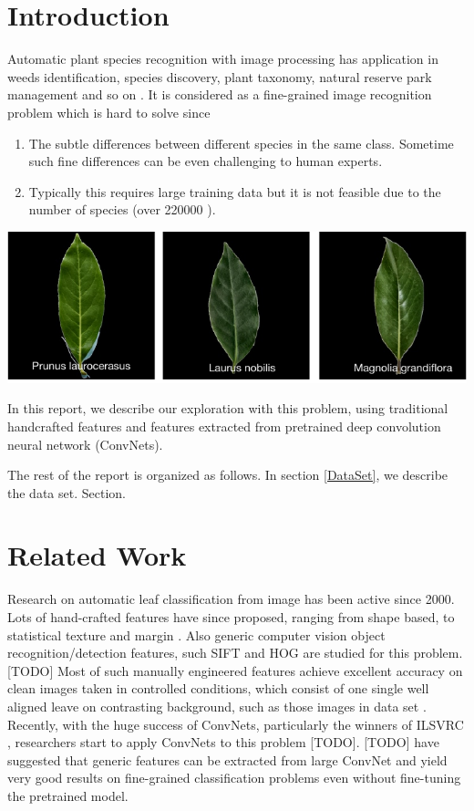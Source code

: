 \documentclass[journal, 10pt]{IEEEtran}
\begin{document}
\section{Introduction}
Automatic plant species recognition with image processing has application in weeds identification, species discovery, plant taxonomy, natural reserve park management and so on \cite{Pedro13}.  It is considered as a fine-grained image recognition problem which is hard to solve since
\begin{enumerate}
  \item The subtle differences between different species in the same class. Sometime such fine differences can be even challenging to human experts.
  \item Typically this requires large training data but it is not feasible due to the number of species (over 220000 \cite{Charles13}).
\end{enumerate}
\centering\includegraphics[width=0.65\linewidth]{easilyconfused}

In this report, we describe our exploration with this problem, using traditional handcrafted features and features extracted from pretrained deep convolution neural network (ConvNets).

The rest of the report is organized as follows. In section \ref{DataSet}, we describe the data set. Section.


\section{Related Work }
Research on automatic leaf classification from image has been active since 2000. Lots of hand-crafted features have since proposed, ranging from shape based, to statistical texture and margin \cite{Charles13} \cite{Pedro13} \cite{Cho2002}. Also generic computer vision object recognition/detection features, such SIFT and HOG are studied for this problem. [TODO]
Most of such manually engineered features achieve excellent accuracy on clean images taken in controlled conditions, which consist of one single well aligned leave on contrasting background, such as those images in data set \cite{SwedishLeafDataset}.
Recently, with the huge success of ConvNets, particularly the winners of ILSVRC \cite{Alex2014}, researchers start to apply ConvNets to this problem [TODO].  [TODO] have suggested that generic features can be extracted from large ConvNet and yield very good results on fine-grained classification problems even without fine-tuning the pretrained model.
\end{document}
